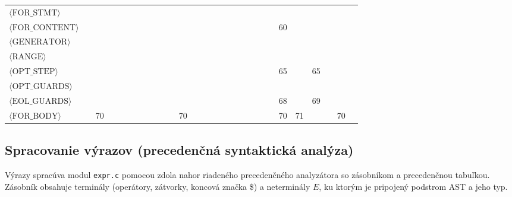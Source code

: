 \begin{center}
\begin{tabular}{l|ccccccccccccccccccccccccccc}
$\langle\text{FOR\_STMT}\rangle$ &  &  &  &  &  &  &  &  &  &  &  &  &  &  &  &  &  &  &  &  &  &  &  &  &  \\
$\langle\text{FOR\_CONTENT}\rangle$ &  &  &  &  &  &  &  &  &  &  &  &  &  &  &  &  &  &  &  &  &  & 60 &  &  &  \\
$\langle\text{GENERATOR}\rangle$ &  &  &  &  &  &  &  &  &  &  &  &  &  &  &  &  &  &  &  &  &  &  &  &  &  \\
$\langle\text{RANGE}\rangle$ &  &  &  &  &  &  &  &  &  &  &  &  &  &  &  &  &  &  &  &  &  &  &  &  &  \\
$\langle\text{OPT\_STEP}\rangle$ &  &  &  &  &  &  &  &  &  &  &  &  &  &  &  &  &  &  &  &  &  & 65 &  & 65 &  &  \\
$\langle\text{OPT\_GUARDS}\rangle$ &  &  &  &  &  &  &  &  &  &  &  &  &  &  &  &  &  &  &  &  &  &  &  &  &  \\
$\langle\text{EOL\_GUARDS}\rangle$ &  &  &  &  &  &  &  &  &  &  &  &  &  &  &  &  &  &  &  &  &  & 68 &  & 69 &  &  \\
$\langle\text{FOR\_BODY}\rangle$ &  & 70 &  &  &  &  &  &  &  &  & 70 &  &  &  &  &  &  &  &  &  &  & 70 & 71 &  &  & 70 &  \\
\bottomrule
\end{tabular}
\label{tab:ll1_part2}
\end{center}











\subsection{Spracovanie výrazov (precedenčná syntaktická analýza)}
\label{sec:expr}
Výrazy spracúva modul \texttt{expr.c} pomocou zdola nahor riadeného precedenčného analyzátora so zásobníkom a precedenčnou tabuľkou. Zásobník obsahuje terminály (operátory, zátvorky, koncová značka \$) a neterminály $E$, ku ktorým je pripojený podstrom AST a jeho typ.

